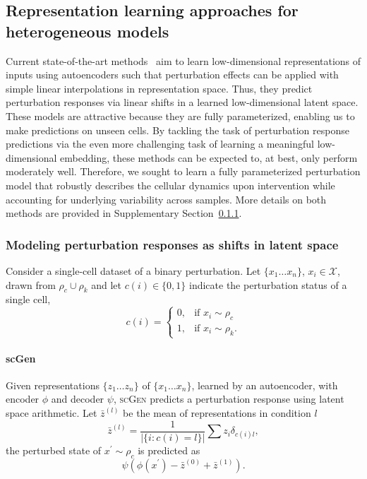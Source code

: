 \subsection{Representation learning approaches for heterogeneous models}  %
Current state-of-the-art methods~\citep{lopez2018, lotfollahi2019, yang2020} aim to learn low-dimensional representations of inputs using autoencoders such that perturbation effects can be applied with simple linear interpolations in representation space. Thus, they predict perturbation responses via linear shifts in a learned low-dimensional latent space. These models are attractive because they are fully parameterized, enabling us to make predictions on unseen cells. By tackling the task of perturbation response predictions via the even more challenging task of learning a meaningful low-dimensional embedding, these methods can be expected to, at best, only perform moderately well. Therefore, we sought to learn a fully parameterized perturbation model that robustly describes the cellular dynamics upon intervention while accounting for underlying variability across samples. More details on both methods are provided in Supplementary Section~\ref{supp:ae_methods}.

\subsubsection{Modeling perturbation responses as shifts in latent space} \label{supp:ae_methods}
Consider a single-cell dataset of a binary perturbation.
Let $\{x_1 \ldots x_n\}$, $x_i \in \mathcal{X}$, drawn from $\rho_c \cup \rho_k$
and let $c(i) \in \{0, 1\}$ indicate the perturbation status of a single cell,
\[
    c(i) = 
\begin{cases}
    0, & \text{if } x_i \sim \rho_c\\
    1, & \text{if } x_i \sim \rho_k.
\end{cases}
\]

\paragraph{scGen}
Given representations $\{z_1 \ldots z_n \}$ of $\{x_1 \ldots x_n\}$, learned by an autoencoder, with encoder $\phi$ and decoder $\psi$,
\textsc{scGen} \citep{lotfollahi2019} predicts a perturbation response using latent space arithmetic.
Let $\bar{z}^{(l)}$ be the mean of representations in condition $l$
\begin{equation*}
    \bar{z}^{(l)} = \frac{1}{|\{i: c(i) = l\}|} \sum{z_i \delta_{c(i)l}},
\end{equation*}
the perturbed state of $x^\prime \sim \rho_c$ is predicted as
\begin{equation*}
    \psi(\phi(x^\prime) - \bar{z}^{(0)} + \bar{z}^{(1)}).
\end{equation*}

